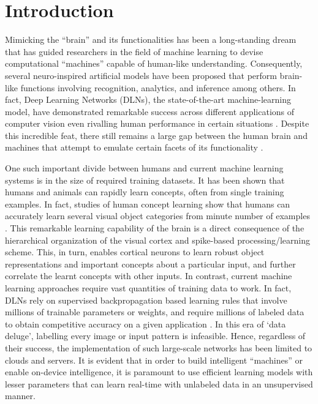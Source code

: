 \documentclass[journal, onecolumn]{IEEEtran}
\begin{document}
\section*{\large\bf{Introduction}}
Mimicking the ``brain'' and its functionalities has been a long-standing dream that has guided researchers in the field of machine learning to devise computational ``machines'' capable of human-like understanding. Consequently, several neuro-inspired artificial models have been proposed \cite{diehl2015unsupervised, lecun2015deep, mnih2015human, ngiam2011multimodal} that perform brain-like functions involving recognition, analytics, and inference among others. In fact, Deep Learning Networks (DLNs), the state-of-the-art machine-learning model, have demonstrated remarkable success across different applications of computer vision even rivalling human performance in certain situations \cite{markoff2011computer,silver2016mastering, he2015delving}. Despite this incredible feat, there still remains a large gap between the human brain and machines that attempt to emulate certain facets of its functionality \cite{cox2014neural, churchland2016computational}.

One such important divide between humans and current machine learning systems is in the size of required training datasets. It has been shown that humans and animals can rapidly learn concepts, often from single training examples. In fact, studies of human concept learning show that humans can accurately learn several visual object categories from minute number of examples \cite{ashby2005human, lake2011one}. This remarkable learning capability of the brain is a direct consequence of the hierarchical organization of the visual cortex and spike-based processing/learning scheme. This, in turn, enables cortical neurons to learn robust object representations and important concepts about a particular input, and further correlate the learnt concepts with other inputs. In contrast, current machine learning approaches require vast quantities of training data to work. In fact, DLNs rely on supervised backpropagation based learning rules that involve millions of trainable parameters or weights, and require millions of labeled data to obtain competitive accuracy on a given application \cite{krizhevsky2012imagenet, han2015learning, iandola2016squeezenet}. %
In this era of `data deluge', labelling every image or input pattern is infeasible. Hence, regardless of their success, the implementation of such large-scale networks has been limited to clouds and servers. It is evident that in order to build intelligent ``machines'' or enable on-device intelligence, it is paramount to use efficient learning models with lesser parameters that can learn real-time with unlabeled data in an unsupervised manner.
\end{document}

